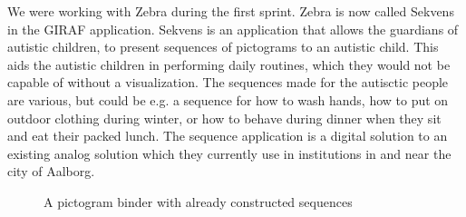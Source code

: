 We were working with Zebra during the first sprint. Zebra is now called Sekvens in the GIRAF application. Sekvens is an application that allows the guardians of autistic children, to present sequences of pictograms to an autistic child. This aids the autistic children in performing daily routines, which they would not be capable of without a visualization. The sequences made for the autisctic people are various, but could be e.g. a sequence for how to wash hands, how to put on outdoor clothing during winter, or how to behave during dinner when they sit and eat their packed lunch. The sequence application is a digital solution to an existing analog solution which they currently use in institutions in and near the city of Aalborg.

\begin{figure}
\centering
\begin{minipage}{.7\textwidth}
\centering
{}
\caption{A pictogram binder with already constructed sequences}
\label{fig:pictogram_binder}

\end{minipage}
\end{figure}
